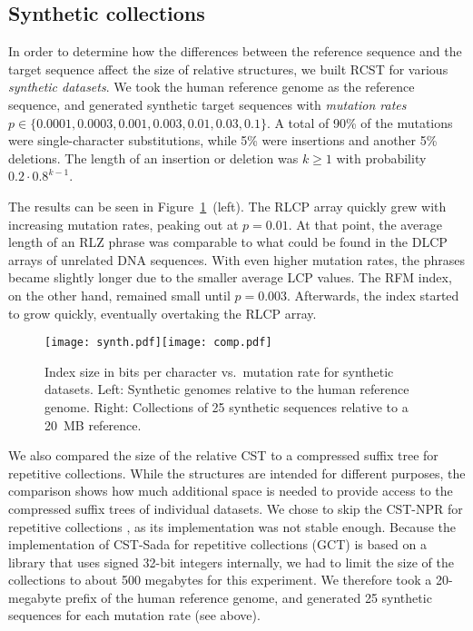 \documentclass[a4paper,11pt]{llncs}
\newcommand{\set}[1]{\ensuremath{\{ #1 \}}}
\newcommand{\CST}{\textsf{CST}}
\newcommand{\CSTsada}{\textsf{CST\nobreakdash-Sada}}
\newcommand{\GCT}{\textsf{GCT}}
\newcommand{\CSTnpr}{\textsf{CST\nobreakdash-NPR}}
\newcommand{\RCST}{\textsf{RCST}}
\newcommand{\RFM}{\textsf{RFM}}
\newcommand{\LCP}{\textsf{LCP}}
\newcommand{\DLCP}{\textsf{DLCP}}
\newcommand{\RLCP}{\textsf{RLCP}}
\newcommand{\RLZ}{\textsf{RLZ}}
\begin{document}
\subsection{Synthetic collections}

In order to determine how the differences between the reference sequence and the target sequence affect the size of relative structures, we built \RCST{} for various \emph{synthetic datasets}. We took the human reference genome as the reference sequence, and generated synthetic target sequences with \emph{mutation rates} $p \in \set{0.0001, 0.0003, 0.001, 0.003, 0.01, 0.03, 0.1}$. A total of 90\% of the mutations were single-character substitutions, while 5\% were insertions and another 5\% deletions. The length of an insertion or deletion was $k \ge 1$ with probability $0.2 \cdot 0.8^{k-1}$.

The results can be seen in Figure~\ref{fig:synthetic}~(left). The \RLCP{} array quickly grew with increasing mutation rates, peaking out at $p = 0.01$. At that point, the average length of an \RLZ{} phrase was comparable to what could be found in the \DLCP{} arrays of unrelated DNA sequences. With even higher mutation rates, the phrases became slightly longer due to the smaller average \LCP{} values. The \RFM{} index, on the other hand, remained small until $p = 0.003$. Afterwards, the index started to grow quickly, eventually overtaking the \RLCP{} array.

\begin{figure}
\begin{center}
\texttt{[image: synth.pdf]}\hspace{-0.4in}\texttt{[image: comp.pdf]}
\end{center}
\caption{Index size in bits per character vs.~mutation rate for synthetic datasets. Left: Synthetic genomes relative to the human reference genome. Right: Collections of 25 synthetic sequences relative to a 20~MB reference.}\label{fig:synthetic}
\end{figure}

We also compared the size of the relative \CST{} to a compressed suffix tree for repetitive collections. While the structures are intended for different purposes, the comparison shows how much additional space is needed to provide access to the compressed suffix trees of individual datasets. We chose to skip the \CSTnpr{} for repetitive collections \cite{Abeliuk2013}, as its implementation was not stable enough. Because the implementation of \CSTsada{} for repetitive collections (\GCT) \cite{Navarro2014} is based on a library that uses signed 32\nobreakdash-bit integers internally, we had to limit the size of the collections to about 500 megabytes for this experiment. We therefore took a 20\nobreakdash-megabyte prefix of the human reference genome, and generated 25 synthetic sequences for each mutation rate (see above).
\end{document}
